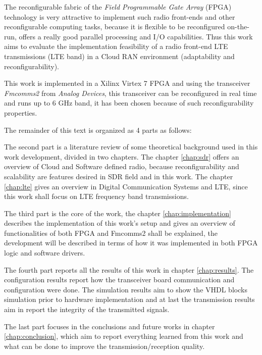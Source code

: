 The reconfigurable fabric of the \textit{Field Programmable Gate Array} (FPGA)
technology is very attractive to implement such radio front-ends and other
reconfigurable computing tasks, because it is flexible to be reconfigured
on-the-run, offers a really good parallel processing and I/O capabilities. Thus
this work aims to evaluate the implementation feasibility of a radio front-end
LTE transmissions (LTE band) in a Cloud RAN environment (adaptability and
reconfigurability).

This work is implemented in a Xilinx Virtex 7 FPGA and using the transceiver
\textit{Fmcomms2} from \textit{Analog Devices}, this transceiver can be
reconfigured in real time and runs up to 6 GHz band, it has been chosen because
of such reconfigurability properties.

The remainder of this text is organized as 4 parts as follows:

The second part is a literature review of some theoretical background used in
this work development, divided in two chapters. The chapter \ref{chap:sdr}
offers an overview of Cloud and Software defined radio, because
reconfigurability and scalability are features desired in SDR field and in this
work. The chapter \ref{chap:lte} gives an overview in Digital Communication
Systems and LTE, since this work shall focus on LTE  frequency band
transmissions.

The third part is the core of the work, the chapter \ref{chap:implementation}
describes the implementation of this work's setup and gives an overview of
functionalities of both FPGA and Fmcomms2 shall be explained, the
development will be described in terms of how it was implemented in both FPGA
logic and software drivers.

The fourth part reports all the results of this work in chapter
\ref{chap:results}. The configuration results report how the transceiver board
communication and configuration were done. The simulation results aim to show
the VHDL blocks simulation prior to hardware implementation and at last the
transmission results aim in report the integrity of the transmitted signals.

The last part focuses in the conclusions and future works in chapter
\ref{chap:conclusion}, which aim to report everything learned from this work and
what can be done to improve the transmission/reception quality.
